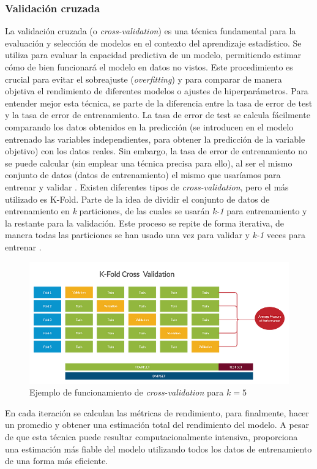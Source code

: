 \documentclass[12pt,a4paper,Spanish]{article}
\begin{document}
\subsubsection{Validación cruzada}\label{cross-validation}
La validación cruzada (o \textit{cross-validation}) es una técnica fundamental para la evaluación y selección de modelos en el contexto del aprendizaje estadístico. Se utiliza para evaluar la capacidad predictiva de un modelo, permitiendo estimar cómo de bien funcionará el modelo en datos no vistos. Este procedimiento es crucial para evitar el sobreajuste (\textit{overfitting}) y para comparar de manera objetiva el rendimiento de diferentes modelos o ajustes de hiperparámetros.
\newline
Para entender mejor esta técnica, se parte de la diferencia entre la tasa de error de test y la tasa de error de entrenamiento. La tasa de error de test se calcula fácilmente comparando los datos obtenidos en la predicción (se introducen en el modelo entrenado las variables independientes, para obtener la predicción de la variable objetivo) con los datos reales. Sin embargo, la tasa de error de entrenamiento no se puede calcular (sin emplear una técnica precisa para ello), al ser el mismo conjunto de datos (datos de entrenamiento) el mismo que usaríamos para entrenar y validar \cite{gareth2013introduction}.
\newline
Existen diferentes tipos de \textit{cross-validation}, pero el más utilizado es K-Fold. Parte de la idea de dividir el conjunto de datos de entrenamiento en \textit{k} particiones, de las cuales se usarán \textit{k-1} para entrenamiento y la restante para la validación. Este proceso se repite de forma iterativa, de manera todas las particiones se han usado una vez para validar y \textit{k-1} veces para entrenar \cite{hastie2009elements}.
\begin{figure}[H]
	\centering
	\includegraphics[width=0.7\linewidth]{figs/cross-validation}
	\caption{Ejemplo de funcionamiento de \textit{cross-validation} para $k = 5$}
	\label{fig:cross-validation}
\end{figure}
En cada iteración se calculan las métricas de rendimiento, para finalmente, hacer un promedio y obtener una estimación total del rendimiento del modelo.
A pesar de que esta técnica puede resultar computacionalmente intensiva, proporciona una estimación más fiable del modelo utilizando todos los datos de entrenamiento de una forma más eficiente.
\end{document}
